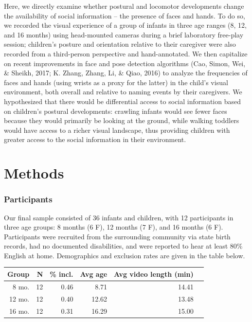 \documentclass[10pt, letterpaper]{article}
\begin{document}
Here, we directly examine whether postural and locomotor developments
change the availability of social information -- the presence of faces
and hands. To do so, we recorded the visual experience of a group of
infants in three age ranges (8, 12, and 16 months) using head-mounted
cameras during a brief laboratory free-play session; children's posture
and orientation relative to their caregiver were also recorded from a
third-person perspective and hand-annotated. We then capitalize on
recent improvements in face and pose detection algorithms (Cao, Simon,
Wei, \& Sheikh, 2017; K. Zhang, Zhang, Li, \& Qiao, 2016) to analyze the
frequencies of faces and hands (using wrists as a proxy for the latter)
in the child's visual environment, both overall and relative to naming
events by their caregivers. We hypothesized that there would be
differential access to social information based on children's postural
developments: crawling infants would see fewer faces because they would
primarily be looking at the ground, while walking toddlers would have
access to a richer visual landscape, thus providing children with
greater access to the social information in their environment.

\section{Methods}\label{methods}

\subsubsection{Participants}\label{participants}

Our final sample consisted of 36 infants and children, with 12
participants in three age groups: 8 months (6 F), 12 months (7 F), and
16 months (6 F). Participants were recruited from the surrounding
community via state birth records, had no documented disabilities, and
were reported to hear at least 80\% English at home. Demographics and
exclusion rates are given in the table below.

\begin{table}[ht]
\centering
\begin{tabular}{rrrrrr}
\hline
Group & N & \% incl. & Avg age & Avg video length (min) \\ 
\hline
8 mo. &   12 & 0.46 & 8.71 & 14.41 \\ 
12 mo. &  12 & 0.40 & 12.62 & 13.48 \\ 
16 mo. &  12 & 0.31 & 16.29 & 15.00\\ 
\hline
\end{tabular}
\end{table}
\end{document}
